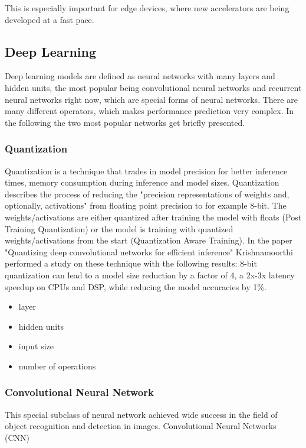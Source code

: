 This is especially important for edge devices, where new accelerators are being developed at a fast pace.
\subsection{Deep Learning}


Deep learning models are defined as neural networks with many layers and hidden units, the most popular being convolutional neural networks and recurrent neural networks right now, which are special forms of neural networks.
There are many different operators, which makes performance prediction very complex.
In the following the two most popular networks get briefly presented.
\subsubsection{Quantization}
Quantization is a technique that trades in model precision for better inference times, memory consumption during inference and model sizes.
Quantization describes the process of reducing the "precision representations of weights and, optionally, activations" \cite{tfLiteQuant} from floating point precision to for example 8-bit.
The weights/activations are either quantized after training the model with floats (Post Training Quantization) or the model is training with quantized weights/activations from the start (Quantization Aware Training). In the paper "Quantizing deep convolutional networks for
efficient inference"\cite{Quantizing} Krishnamoorthi performed a study on these technique with the following results:
8-bit quantization can lead to a model size reduction by a factor of 4, a 2x-3x latency speedup on CPUs and DSP, while reducing the model accuracies by 1\%.

\begin{itemize}
    \item layer
    \item hidden units
    \item input size
    \item number of operations
\end{itemize}
\subsubsection{Convolutional Neural Network}
This special subclass of neural network achieved wide success in the field of object recognition and detection in images. Convolutional Neural Networks (CNN)
